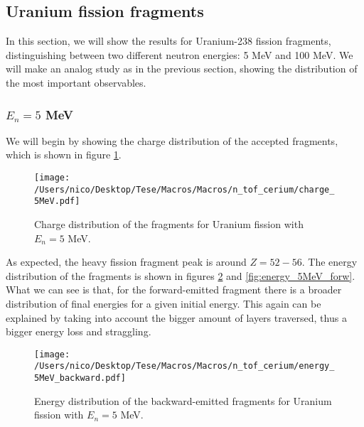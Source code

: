 \documentclass{article}
\begin{document}
\subsection{Uranium fission fragments}
In this section, we will show the results for Uranium-238 fission fragments, distinguishing between two different neutron energies: 5 MeV and 100 MeV. We will make an analog study as in the previous section, showing the distribution of the most important observables.
\subsubsection*{$E_n=5$ MeV}
We will begin by showing the charge distribution of the accepted fragments, which is shown in figure \ref{fig:charge_5MeV}.

\begin{figure}[H]
    \centering
    \texttt{[image: /Users/nico/Desktop/Tese/Macros/Macros/n\_tof\_cerium/charge\_5MeV.pdf]}
    \caption{Charge distribution of the fragments for Uranium fission with $E_n=5$ MeV.}
    \label{fig:charge_5MeV}
\end{figure}
As expected, the heavy fission fragment peak is around $Z=52-56$. The energy distribution of the fragments is shown in figures \ref{fig:energy_5MeV_back} and \ref{fig:energy_5MeV_forw}. What we can see is that, for the forward-emitted fragment there is a broader distribution of final energies for a given initial energy. This again can be explained by taking into account the bigger amount of layers traversed, thus a bigger energy loss and straggling.

\begin{figure}[H]
    \centering
    \texttt{[image: /Users/nico/Desktop/Tese/Macros/Macros/n\_tof\_cerium/energy\_5MeV\_backward.pdf]}
    \caption{Energy distribution of the backward-emitted fragments for Uranium fission with $E_n=5$ MeV.}
    \label{fig:energy_5MeV_back}
\end{figure}
\end{document}
